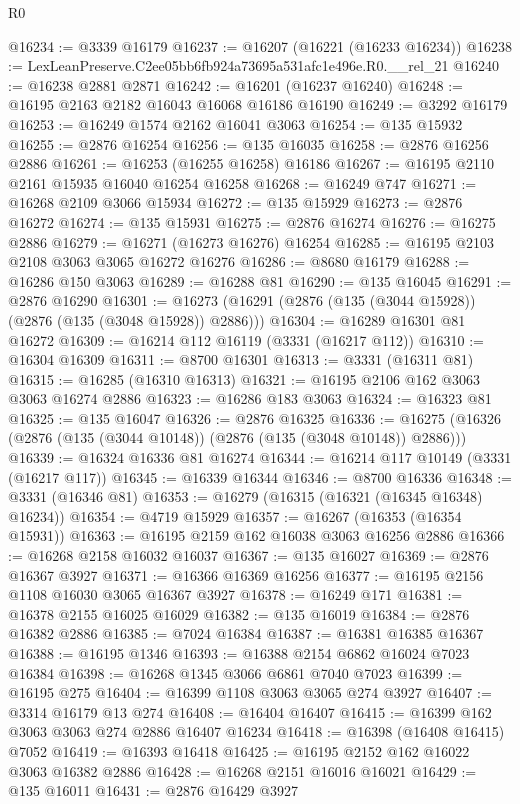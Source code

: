 \begin{lexlean}{R0}
\begin{coremodule}
@16234 := @3339 @16179
@16237 := @16207 (@16221 (@16233 @16234))
@16238 := LexLeanPreserve.C2ee05bb6fb924a73695a531afc1e496e.R0.__rel_21
@16240 := @16238 @2881 @2871
@16242 := @16201 (@16237 @16240)
@16248 := @16195 @2163 @2182 @16043 @16068 @16186 @16190
@16249 := @3292 @16179
@16253 := @16249 @1574 @2162 @16041 @3063
@16254 := @135 @15932
@16255 := @2876 @16254
@16256 := @135 @16035
@16258 := @2876 @16256 @2886
@16261 := @16253 (@16255 @16258) @16186
@16267 := @16195 @2110 @2161 @15935 @16040 @16254 @16258
@16268 := @16249 @747
@16271 := @16268 @2109 @3066 @15934
@16272 := @135 @15929
@16273 := @2876 @16272
@16274 := @135 @15931
@16275 := @2876 @16274
@16276 := @16275 @2886
@16279 := @16271 (@16273 @16276) @16254
@16285 := @16195 @2103 @2108 @3063 @3065 @16272 @16276
@16286 := @8680 @16179
@16288 := @16286 @150 @3063
@16289 := @16288 @81
@16290 := @135 @16045
@16291 := @2876 @16290
@16301 := @16273 (@16291 (@2876 (@135 (@3044 @15928)) (@2876 (@135 (@3048 @15928)) @2886)))
@16304 := @16289 @16301 @81 @16272
@16309 := @16214 @112 @16119 (@3331 (@16217 @112))
@16310 := @16304 @16309
@16311 := @8700 @16301
@16313 := @3331 (@16311 @81)
@16315 := @16285 (@16310 @16313)
@16321 := @16195 @2106 @162 @3063 @3063 @16274 @2886
@16323 := @16286 @183 @3063
@16324 := @16323 @81
@16325 := @135 @16047
@16326 := @2876 @16325
@16336 := @16275 (@16326 (@2876 (@135 (@3044 @10148)) (@2876 (@135 (@3048 @10148)) @2886)))
@16339 := @16324 @16336 @81 @16274
@16344 := @16214 @117 @10149 (@3331 (@16217 @117))
@16345 := @16339 @16344
@16346 := @8700 @16336
@16348 := @3331 (@16346 @81)
@16353 := @16279 (@16315 (@16321 (@16345 @16348) @16234))
@16354 := @4719 @15929
@16357 := @16267 (@16353 (@16354 @15931))
@16363 := @16195 @2159 @162 @16038 @3063 @16256 @2886
@16366 := @16268 @2158 @16032 @16037
@16367 := @135 @16027
@16369 := @2876 @16367 @3927
@16371 := @16366 @16369 @16256
@16377 := @16195 @2156 @1108 @16030 @3065 @16367 @3927
@16378 := @16249 @171
@16381 := @16378 @2155 @16025 @16029
@16382 := @135 @16019
@16384 := @2876 @16382 @2886
@16385 := @7024 @16384
@16387 := @16381 @16385 @16367
@16388 := @16195 @1346
@16393 := @16388 @2154 @6862 @16024 @7023 @16384
@16398 := @16268 @1345 @3066 @6861 @7040 @7023
@16399 := @16195 @275
@16404 := @16399 @1108 @3063 @3065 @274 @3927
@16407 := @3314 @16179 @13 @274
@16408 := @16404 @16407
@16415 := @16399 @162 @3063 @3063 @274 @2886 @16407 @16234
@16418 := @16398 (@16408 @16415) @7052
@16419 := @16393 @16418
@16425 := @16195 @2152 @162 @16022 @3063 @16382 @2886
@16428 := @16268 @2151 @16016 @16021
@16429 := @135 @16011
@16431 := @2876 @16429 @3927

\end{coremodule}
\end{lexlean}
